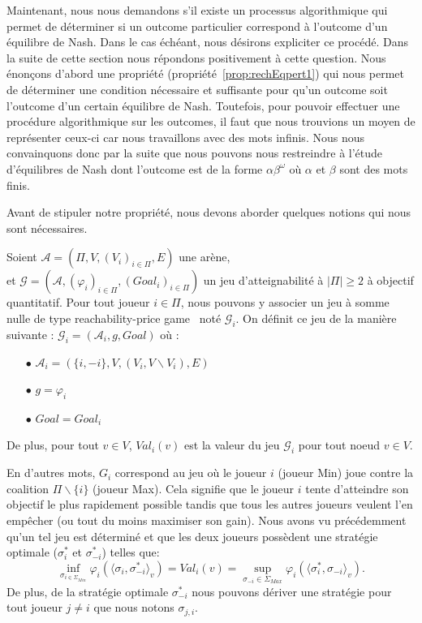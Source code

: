 Maintenant, nous nous demandons s'il existe un processus algorithmique qui permet de déterminer si un outcome particulier correspond à l'outcome d'un équilibre de Nash. Dans le cas échéant, nous désirons expliciter ce procédé. Dans la suite de cette section nous répondons positivement à cette question. Nous énonçons d'abord une propriété (propriété~\ref{prop:rechEqpert1}) qui nous permet de déterminer une condition nécessaire et suffisante pour qu'un outcome soit l'outcome d'un certain équilibre de Nash. Toutefois, pour pouvoir effectuer une procédure algorithmique sur les outcomes, il faut que nous trouvions un moyen de représenter ceux-ci car nous travaillons avec des mots infinis. Nous nous convainquons donc par la suite que nous pouvons nous restreindre à l'étude d'équilibres de Nash dont l'outcome est de la forme $\alpha \beta^{\omega}$ où $\alpha$ et $\beta$ sont des mots finis. 

Avant de stipuler notre propriété, nous devons aborder quelques notions qui nous sont nécessaires.


\begin{defi}
	\label{defi:coalGame}
 Soient $\mathcal{A} = (\Pi, V, (V_{i})_{i\in\Pi}, E)$ une arène,\\
et $\mathcal{G} = (\mathcal{A}, (\varphi _{i})_{i\in\Pi}, (Goal_{i})_{i\in\Pi})$ un jeu d'atteignabilité à $|\Pi| \geq 2$ à objectif quantitatif.
Pour tout joueur $i \in \Pi$, nous pouvons y associer un jeu à somme nulle de type \og reachability-price game \fg~noté $\mathcal{G}_{i}$.
On définit ce jeu de la manière suivante : 
$ \displaystyle \mathcal{G}_{i}= (\mathcal{A}_{i}, g , Goal) \text{ où }$:
\begin{itemize}
	\item[$\bullet$] $\mathcal{A}_{i} = (\{i,-i \}, V, (V_{i},V\backslash V_i),E)$
	\item[$\bullet$] $g = \varphi_i$ 
	\item[$\bullet$] $Goal = Goal_i$
\end{itemize}

\noindent De plus, pour tout $v\in V$, $Val_i(v)$ est la valeur du jeu $\mathcal{G}_i$ pour tout noeud $v\in V$. 
\end{defi} 

En d'autres mots, $G_i$ correspond au jeu où le joueur $i$ (joueur Min) joue contre la coalition $\Pi\backslash\{ i \}$ (joueur Max). Cela signifie que le joueur $i$ tente d'atteindre son objectif le plus rapidement possible tandis que tous les autres joueurs veulent l'en empêcher (ou tout du moins maximiser son gain). Nous avons vu précédemment qu'un tel jeu est déterminé et que les deux joueurs possèdent une stratégie optimale ($\sigma^*_i$ et $\sigma^*_{-i}$) telles que:
$$ \inf_{\sigma _{i\in \Sigma _{Min}}} \varphi_i(\langle \sigma_i,\sigma^*_{-i}\rangle_v)= Val_i(v) = \sup _{\sigma_{-i}\in \Sigma_{Max}} \varphi_i(\langle \sigma^*_i, \sigma_{-i}\rangle_v).$$ De plus, de la stratégie optimale $\sigma^*_{-i}$ nous pouvons dériver une stratégie pour tout joueur $j \neq i$ que nous notons $\sigma_{j,i}$.\\

